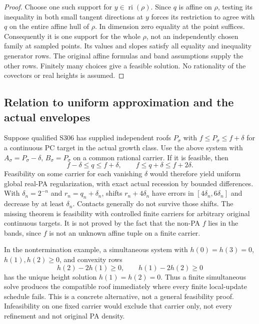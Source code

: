 \documentclass[11pt]{article}
\newcommand{\ri}{\operatorname{ri}}
\begin{document}
\begin{proof}
Choose one such support for $y\in\ri(\rho)$. Since $q$ is affine on $\rho$, testing its inequality in both small tangent directions at $y$ forces its restriction to agree with $q$ on the entire affine hull of $\rho$. In dimension zero equality at the point suffices. Consequently it is one support for the whole $\rho$, not an independently chosen family at sampled points. Its values and slopes satisfy all equality and inequality generator rows. The original affine formulas and band assumptions supply the other rows. Finitely many choices give a feasible solution. No rationality of the covectors or real heights is assumed.
\end{proof}

\subsection{Relation to uniform approximation and the actual envelopes}
Suppose qualified S306 has supplied independent roofs $P_\sigma$ with $f\leq P_\sigma\leq f+\delta$ for a continuous PC target in the actual growth class. Use the above system with $A_\sigma=P_\sigma-\delta$, $B_\sigma=P_\sigma$ on a common rational carrier. If it is feasible, then
\[
 f-\delta\leq q\leq f+\delta,
 \qquad f\leq q+\delta\leq f+2\delta.                              \tag{5.2}
\]
Feasibility on some carrier for each vanishing $\delta$ would therefore yield uniform global real-PA regularization, with exact actual recession by bounded differences. With $\delta_n=2^{-n}$ and $r_n=q_n+\delta_n$, shifts $r_n+4\delta_n$ have errors in $[4\delta_n,6\delta_n]$ and decrease by at least $\delta_n$. Contacts generally do not survive those shifts. The missing theorem is feasibility with controlled finite carriers for arbitrary original continuous targets. It is not proved by the fact that the non-PA $f$ lies in the bands, since $f$ is not an unknown affine tuple on a finite carrier.

In the nontermination example, a simultaneous system with $h(0)=h(3)=0$, $h(1),h(2)\geq0$, and convexity rows
\[
 h(2)-2h(1)\geq0,\qquad h(1)-2h(2)\geq0
\]
has the unique height solution $h(1)=h(2)=0$. Thus a finite simultaneous solve produces the compatible roof immediately where every finite local-update schedule fails. This is a concrete alternative, not a general feasibility proof. Infeasibility on one fixed carrier would exclude that carrier only, not every refinement and not original PA density.
\end{document}
